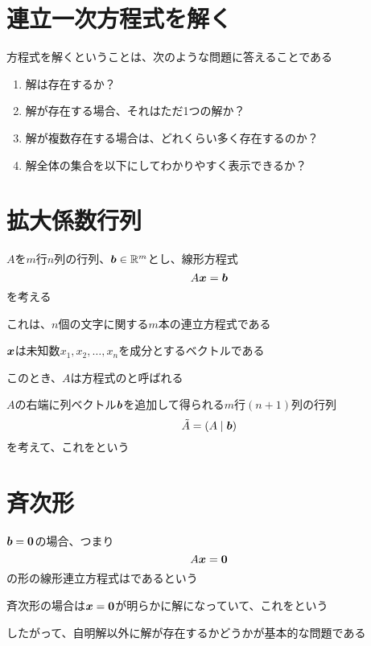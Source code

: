 \documentclass[../../../topic_linear-algebra]{subfiles}
\begin{document}
\sectionline
\section{連立一次方程式を解く}

方程式を解くということは、次のような問題に答えることである

\begin{enumerate}[label=\Alph*.]
  \item 解は存在するか？
  \item 解が存在する場合、それはただ1つの解か？
  \item 解が複数存在する場合は、どれくらい多く存在するのか？
  \item 解全体の集合を以下にしてわかりやすく表示できるか？
\end{enumerate}

\sectionline
\section{拡大係数行列}

$A$を$m$行$n$列の行列、$\vb*{b} \in \mathbb{R}^m$とし、線形方程式
\begin{equation*}
  A\vb*{x} = \vb*{b}
\end{equation*}
を考える

これは、$n$個の文字に関する$m$本の連立方程式である

$\vb*{x}$は未知数$x_1, x_2, \dots, x_n$を成分とするベクトルである

\br

このとき、$A$は方程式のと呼ばれる

$A$の右端に列ベクトル$\vb*{b}$を追加して得られる$m$行$(n+1)$列の行列
\begin{equation*}
  \tilde{A} = (A \mid \vb*{b})
\end{equation*}
を考えて、これをという

\sectionline
\section{斉次形}

$\vb*{b}=\vb*{0}$の場合、つまり
\begin{equation*}
  A\vb*{x} = \vb*{0}
\end{equation*}
の形の線形連立方程式はであるという

\br

斉次形の場合は$\vb*{x} = \vb*{0}$が明らかに解になっていて、これをという

したがって、自明解以外に解が存在するかどうかが基本的な問題である
\end{document}
